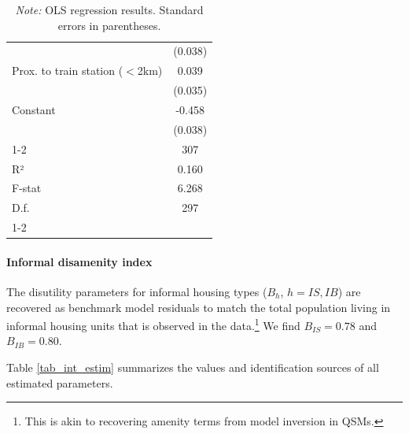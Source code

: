 \documentclass[12pt]{article}
\newcommand\fnote[1]{\captionsetup{justification=raggedright,singlelinecheck=false}\caption*{#1}}
\begin{document}
\begin{table}[htbp!]
\begin{tabular}{ll}
\multicolumn{1}{c}{}&
\multicolumn{1}{c}{(0.038)}\\
\multicolumn{1}{l}{Prox. to train station ($<$2km)}&
\multicolumn{1}{c}{0.039}\\
\multicolumn{1}{c}{}&
\multicolumn{1}{c}{(0.035)}\\
\multicolumn{1}{l}{Constant}&
\multicolumn{1}{c}{-0.458}\\
\multicolumn{1}{c}{}&
\multicolumn{1}{c}{(0.038)}\\
\cline{1-2}
\multicolumn{1}{l}{Obs.}&
\multicolumn{1}{c}{307}\\
\multicolumn{1}{l}{R²}&
\multicolumn{1}{c}{0.160}\\
\multicolumn{1}{l}{F-stat}&
\multicolumn{1}{c}{6.268}\\
\multicolumn{1}{l}{D.f.}&
\multicolumn{1}{c}{297}\\
\cline{1-2}
\end{tabular}
\fnote{\centering\scriptsize{\textit{Note:} OLS regression results. Standard errors in parentheses.}}
\end{table}


\paragraph{Informal disamenity index}

The disutility parameters for informal housing types ($B_h$, $h=IS,IB$) are recovered as benchmark model residuals to match the total population living in informal housing units that is observed in the data.\footnote{This is akin to recovering amenity terms from model inversion in QSMs.} We find $B_{IS}=0.78$ and $B_{IB}=0.80$.

Table \ref{tab_int_estim} summarizes the values and identification sources of all estimated parameters.
\end{document}
